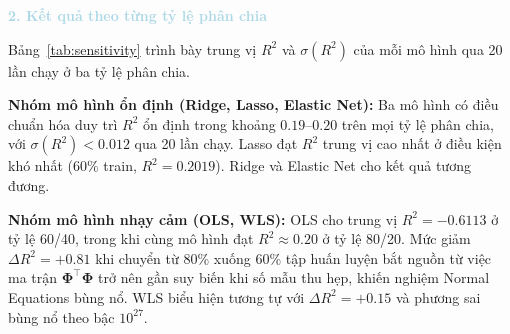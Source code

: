 \vspace{0.5em}
\noindent\textcolor{lightblue}{\textbf{2. Kết quả theo từng tỷ lệ phân chia}}
\vspace{0.5em}

Bảng~\ref{tab:sensitivity} trình bày trung vị $R^2$ và $\sigma(R^2)$ của mỗi mô hình qua 20 lần chạy
ở ba tỷ lệ phân chia.

\begin{table}[h]
\centering
\caption{Trung vị $R^2$ và độ lệch chuẩn $\sigma(R^2)$ qua 20 lần chạy theo tỷ lệ phân chia.
Ô đánh dấu ($\dagger$) biểu thị kết quả bất thường do mô hình không ổn định.}
\label{tab:sensitivity}
\end{table}

\textbf{Nhóm mô hình ổn định (Ridge, Lasso, Elastic Net):}
Ba mô hình có điều chuẩn hóa duy trì $R^2$ ổn định trong khoảng $0.19$--$0.20$
trên mọi tỷ lệ phân chia, với $\sigma(R^2) < 0.012$ qua 20 lần chạy.
Lasso đạt $R^2$ trung vị cao nhất ở điều kiện khó nhất ($60\%$ train, $R^2 = 0.2019$).
Ridge và Elastic Net cho kết quả tương đương.

\textbf{Nhóm mô hình nhạy cảm (OLS, WLS):}
OLS cho trung vị $R^2 = -0.6113$ ở tỷ lệ 60/40, trong khi cùng mô hình đạt $R^2 \approx 0.20$ ở tỷ lệ 80/20.
Mức giảm $\Delta R^2 = +0.81$ khi chuyển từ $80\%$ xuống $60\%$ tập huấn luyện bắt nguồn từ việc
ma trận $\boldsymbol{\Phi}^\top\boldsymbol{\Phi}$ trở nên gần suy biến khi số mẫu thu hẹp,
khiến nghiệm Normal Equations bùng nổ.
WLS biểu hiện tương tự với $\Delta R^2 = +0.15$ và phương sai bùng nổ theo bậc $10^{27}$.

